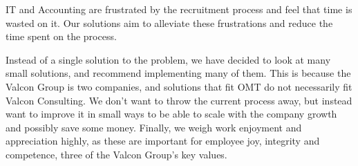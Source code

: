IT and Accounting are frustrated by the recruitment process and feel that time is wasted on it.
Our solutions aim to alleviate these frustrations and reduce the time spent on the process.

Instead of a single solution to the problem, we have decided to look at many small solutions, and recommend implementing many of them.
This is because the Valcon Group is two companies, and solutions that fit OMT do not necessarily fit Valcon Consulting.
We don't want to throw the current process away, but instead want to improve it in small ways to be able to scale with the company growth and possibly save some money.
Finally, we weigh work enjoyment and appreciation highly, as these are important for employee joy, integrity and competence, three of the Valcon Group's key values.

